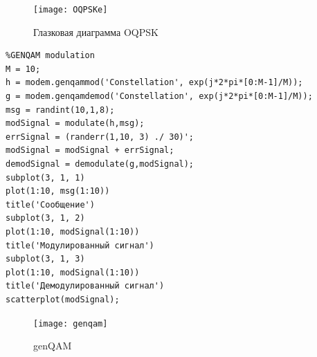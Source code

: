 \documentclass[10pt,a4paper]{article}
\begin{document}
\begin{figure}[h]\centering
	\texttt{[image: OQPSKe]}
	\caption{Глазковая диаграмма OQPSK}\label{fig.OQPSKe}
\end{figure}                                                                                                                                                                                                                                                                                                                                                                                                                                                                                                                                                                                                                                                                                                                                                                                                                                                                                                                                                                                                                                                                                                                                                                                                                                                                                                                                                                                                                                                                        
\FloatBarrier
\begin{verbatim}
%GENQAM modulation
M = 10;
h = modem.genqammod('Constellation', exp(j*2*pi*[0:M-1]/M));
g = modem.genqamdemod('Constellation', exp(j*2*pi*[0:M-1]/M));
msg = randint(10,1,8);
modSignal = modulate(h,msg);
errSignal = (randerr(1,10, 3) ./ 30)';
modSignal = modSignal + errSignal;
demodSignal = demodulate(g,modSignal);
subplot(3, 1, 1)
plot(1:10, msg(1:10))
title('Сообщение')
subplot(3, 1, 2)
plot(1:10, modSignal(1:10))
title('Модулированный сигнал')
subplot(3, 1, 3)
plot(1:10, modSignal(1:10))
title('Демодулированный сигнал')
scatterplot(modSignal);
\end{verbatim}
\begin{figure}[h]\centering
	\texttt{[image: genqam]}
	\caption{genQAM}\label{fig.genqam}
\end{figure}
\end{document}
